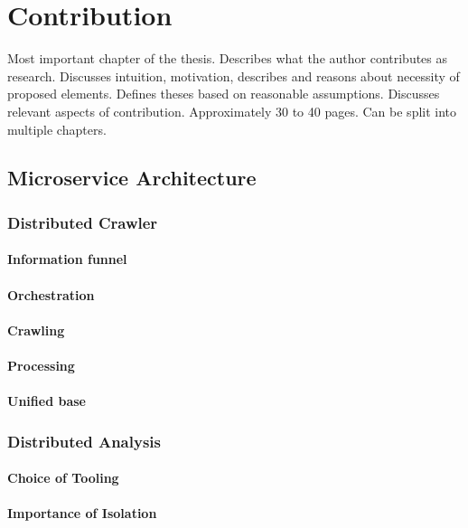 \chapter{Contribution}

Most important chapter of the thesis. Describes what the author contributes as research. Discusses intuition, motivation, describes and reasons about necessity of proposed elements. Defines theses based on reasonable assumptions. Discusses relevant aspects of contribution. Approximately 30 to 40 pages. Can be split into multiple chapters.

\section{Microservice Architecture}
\subsection{Distributed Crawler}
\subsubsection{Information funnel}
\subsubsection{Orchestration}
\subsubsection{Crawling}
\subsubsection{Processing}
\subsubsection{Unified base}
\subsection{Distributed Analysis}
\subsubsection{Choice of Tooling}
\subsubsection{Importance of Isolation}
